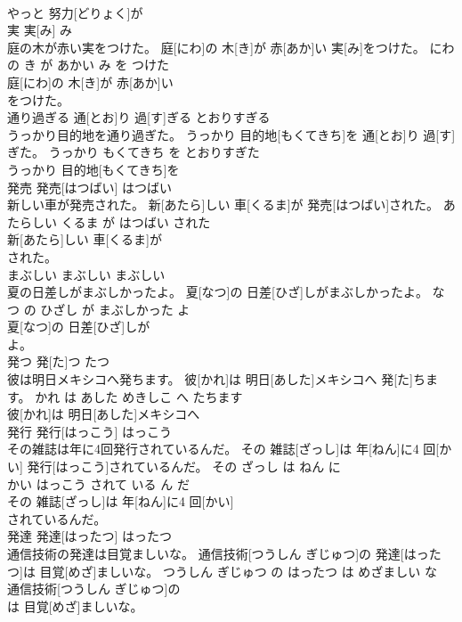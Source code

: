 \documentclass[8pt]{extreport}
\begin{document}
\begin{CJK}{UTF8}{min}
\\	やっと 努力[どりょく]が
\\	実	実[み]	み	
\\	庭の木が赤い実をつけた。	庭[にわ]の 木[き]が 赤[あか]い 実[み]をつけた。	にわ の き が あかい み を つけた	
\\	庭[にわ]の 木[き]が 赤[あか]い
\\	をつけた。			
\\	通り過ぎる	通[とお]り 過[す]ぎる	とおりすぎる	
\\	うっかり目的地を通り過ぎた。	うっかり 目的地[もくてきち]を 通[とお]り 過[す]ぎた。	うっかり もくてきち を とおりすぎた	
\\	うっかり 目的地[もくてきち]を
\\	発売	発売[はつばい]	はつばい	
\\	新しい車が発売された。	新[あたら]しい 車[くるま]が 発売[はつばい]された。	あたらしい くるま が はつばい された	
\\	新[あたら]しい 車[くるま]が
\\	された。			
\\	まぶしい	まぶしい	まぶしい	
\\	夏の日差しがまぶしかったよ。	夏[なつ]の 日差[ひざ]しがまぶしかったよ。	なつ の ひざし が まぶしかった よ	
\\	夏[なつ]の 日差[ひざ]しが
\\	よ。			
\\	発つ	発[た]つ	たつ	
\\	彼は明日メキシコへ発ちます。	彼[かれ]は 明日[あした]メキシコへ 発[た]ちます。	かれ は あした めきしこ へ たちます	
\\	彼[かれ]は 明日[あした]メキシコへ
\\	発行	発行[はっこう]	はっこう	
\\	その雑誌は年に4回発行されているんだ。	その 雑誌[ざっし]は 年[ねん]に4 回[かい] 発行[はっこう]されているんだ。	その ざっし は ねん に 
\\	かい はっこう されて いる ん だ	
\\	その 雑誌[ざっし]は 年[ねん]に4 回[かい]
\\	されているんだ。			
\\	発達	発達[はったつ]	はったつ	
\\	通信技術の発達は目覚ましいな。	通信技術[つうしん ぎじゅつ]の 発達[はったつ]は 目覚[めざ]ましいな。	つうしん ぎじゅつ の はったつ は めざましい な	
\\	通信技術[つうしん ぎじゅつ]の
\\	は 目覚[めざ]ましいな。			

\end{CJK}
\end{document}
